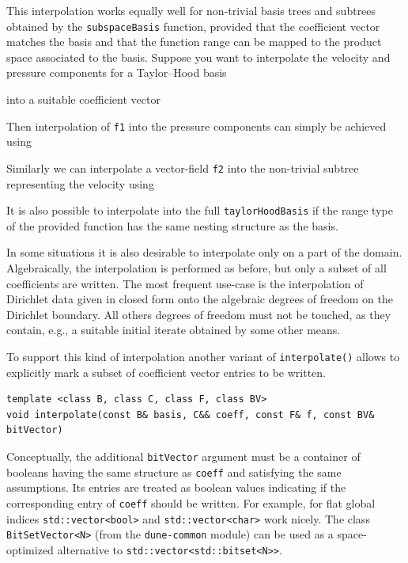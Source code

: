 \documentclass[a4paper,10pt,headings=normal,bibliography=totoc]{scrartcl}
\newcommand{\cpp}[1]{\lstinline[basicstyle=\ttfamily]!#1!}
\newcommand{\dunemodule}[1]{\texttt{#1}}
\begin{document}
This interpolation works equally well for non-trivial basis trees
and subtrees obtained by the \cpp{subspaceBasis} function,
provided that the coefficient vector matches the basis
and that the function range can be mapped to the product space
associated to the basis.
Suppose you want to interpolate
the velocity and pressure components for a Taylor--Hood basis
%

%
into a suitable coefficient vector
%

%
Then interpolation of \cpp{f1} into the pressure components can simply
be achieved using
%

%
Similarly we can interpolate a vector-field \cpp{f2}
into the non-trivial subtree representing the velocity using
%

%
It is also possible to interpolate into the full \cpp{taylorHoodBasis}
if the range type of the provided function has the same nesting structure
as the basis.


In some situations it is also desirable to interpolate only on a part of the domain.  Algebraically, the interpolation
is performed as before, but only a subset of all coefficients are written.  The most frequent use-case is the interpolation
of Dirichlet data given in closed form onto the algebraic degrees of freedom on the Dirichlet boundary.  All others
degrees of freedom must not be touched, as they contain, e.g., a suitable initial iterate obtained by some other
means.

To support this kind of interpolation another variant of
\cpp{interpolate()} allows to explicitly mark a subset of
coefficient vector entries to be written.
\begin{lstlisting}[style=Interface]
template <class B, class C, class F, class BV>
void interpolate(const B& basis, C&& coeff, const F& f, const BV& bitVector)
\end{lstlisting}
Conceptually, the additional \cpp{bitVector}
argument must be a container of booleans having
the same structure as \cpp{coeff} and satisfying
the same assumptions.  Its entries are treated as boolean
values indicating if the corresponding entry of \cpp{coeff}
should be written.
For example, for flat global indices \cpp{std::vector<bool>} and
\cpp{std::vector<char>} work nicely.
The class \cpp{BitSetVector<N>} (from the \dunemodule{dune-common} module) can be used
as a space-optimized alternative to \cpp{std::vector<std::bitset<N>>}.
\end{document}
